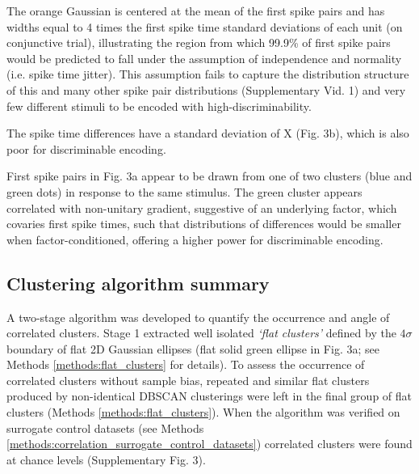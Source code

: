 \documentclass{article}
\begin{document}
The orange Gaussian is centered at the mean of the first spike pairs and has widths equal to 4 times the first spike time standard deviations of each unit (on conjunctive trial), illustrating the region from which 99.9\% of first spike pairs would be predicted to fall under the assumption of independence and normality (i.e. spike time jitter). This assumption fails to capture the distribution structure of this and many other spike pair distributions (Supplementary Vid. 1) and very few different stimuli to be encoded with high-discriminability. 

The spike time differences have a standard deviation of X (Fig. 3b), which is also poor for discriminable encoding. 

First spike pairs in Fig. 3a appear to be drawn from one of two clusters (blue and green dots) in response to the same stimulus. The green cluster appears correlated with non-unitary gradient, suggestive of an underlying factor, which covaries first spike times, such that distributions of differences would be smaller when factor-conditioned, offering a higher power for discriminable encoding. 


\subsection*{Clustering algorithm summary}
A two-stage algorithm was developed to quantify the occurrence and angle of correlated clusters. 
Stage 1 extracted well isolated \textit{`flat clusters'} defined by the $4\sigma$ boundary of flat 2D Gaussian ellipses (flat solid green ellipse in Fig. 3a; see Methods \ref{methods:flat_clusters} for details).  
To assess the occurrence of correlated clusters without sample bias, repeated and similar flat clusters produced by non-identical DBSCAN clusterings were left in the final group of flat clusters (Methods \ref{methods:flat_clusters}). When the algorithm was verified on surrogate control datasets (see Methods \ref{methods:correlation_surrogate_control_datasets}) correlated clusters were found at chance levels (Supplementary Fig. 3). 
\end{document}
